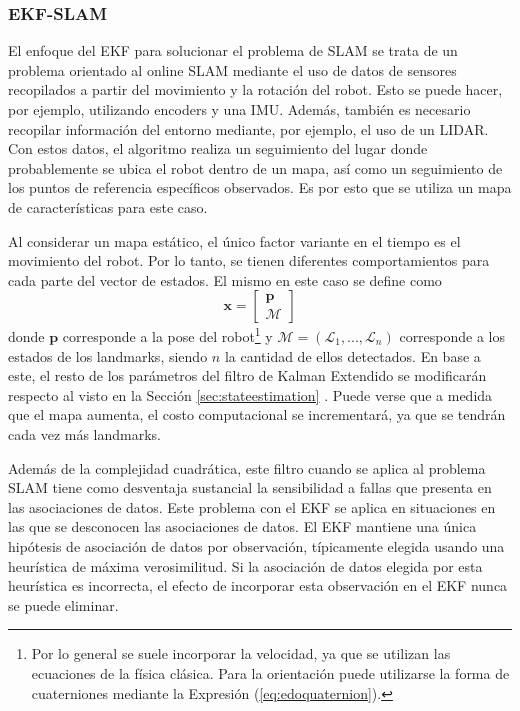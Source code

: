 \subsubsection{EKF-SLAM}
El enfoque del EKF para solucionar el problema de SLAM se trata de un problema orientado al online SLAM mediante el uso de datos de sensores recopilados a partir del movimiento y la rotación del robot. Esto se puede hacer, por ejemplo, utilizando encoders y una IMU. Además, también es necesario recopilar información del entorno mediante, por ejemplo, el uso de un LIDAR. Con estos datos, el algoritmo realiza un seguimiento del lugar donde probablemente se ubica el robot dentro de un mapa, así como un seguimiento de los puntos de referencia específicos observados. Es por esto que se utiliza un mapa de características para este caso.

Al considerar un mapa estático, el único factor variante en el tiempo es el movimiento del robot. Por lo tanto, se tienen diferentes comportamientos para cada parte del vector de estados. El mismo en este caso se define como
\begin{equation}
    \bm{x} = 
    \begin{bmatrix}
        \bm{p} \\
        \bm{\mathcal{M}}
    \end{bmatrix}
\end{equation}
donde $\bm{p}$ corresponde a la pose del robot\footnote{Por lo general se suele incorporar la velocidad, ya que se utilizan las ecuaciones de la física clásica. Para la orientación puede utilizarse la forma de cuaterniones mediante la Expresión (\ref{eq:edoquaternion}).} y $\bm{\mathcal{M}}=(\mathcal{L}_1,...,\mathcal{L}_n)$ corresponde a los estados de los landmarks, siendo $n$ la cantidad de ellos detectados. En base a este, el resto de los parámetros del filtro de Kalman Extendido se modificarán respecto al visto en la Sección \ref{sec:stateestimation} \cite{sola2014}. Puede verse que a medida que el mapa aumenta, el costo computacional se incrementará, ya que se tendrán cada vez más landmarks.

Además de la complejidad cuadrática, este filtro cuando se aplica al problema SLAM tiene como desventaja sustancial \cite{csorba1997} la sensibilidad a fallas que presenta en las asociaciones de datos. Este problema con el EKF se aplica en situaciones en las que se desconocen las asociaciones de datos. El EKF mantiene una única hipótesis de asociación de datos por observación, típicamente elegida usando una heurística de máxima verosimilitud. Si la asociación de datos elegida por esta heurística es incorrecta, el efecto de incorporar esta observación en el EKF nunca se puede eliminar.

